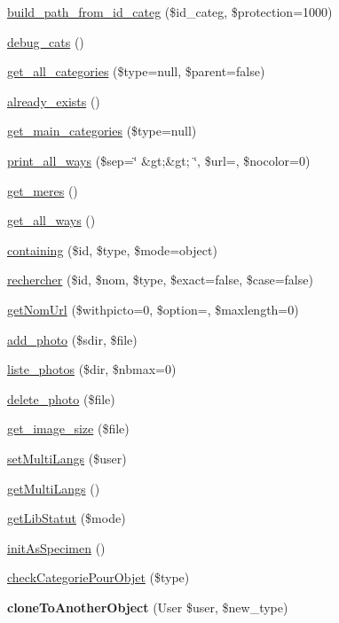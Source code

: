 \begin{DoxyCompactItemize}
\hyperlink{classCategorie_aa8539099fbf0facdd555963cdd13eb21}{build\+\_\+path\+\_\+from\+\_\+id\+\_\+categ} (\$id\+\_\+categ, \$protection=1000)
\item 
\hyperlink{classCategorie_a1ce1fc39978dbc51235945c2d6ae8d97}{debug\+\_\+cats} ()
\item 
\hyperlink{classCategorie_a7c7aa30b1bc78a03d658a4e9689c8b5a}{get\+\_\+all\+\_\+categories} (\$type=null, \$parent=false)
\item 
\hyperlink{classCategorie_a6f0eea2df4c86d7fcc0ffc89360eb765}{already\+\_\+exists} ()
\item 
\hyperlink{classCategorie_a8e991c6ac8e3d833082467de06616c19}{get\+\_\+main\+\_\+categories} (\$type=null)
\item 
\hyperlink{classCategorie_af1fdbc6874f2035558b5eb029c5978b7}{print\+\_\+all\+\_\+ways} (\$sep=\char`\"{} \&gt;\&gt; \char`\"{}, \$url=\textquotesingle{}\textquotesingle{}, \$nocolor=0)
\item 
\hyperlink{classCategorie_ab564dd2c08c0435dca64bb6488103475}{get\+\_\+meres} ()
\item 
\hyperlink{classCategorie_ae0a515bc7d441030158f4e98346bbf35}{get\+\_\+all\+\_\+ways} ()
\item 
\hyperlink{classCategorie_a426051910036f20087478d0571669bf8}{containing} (\$id, \$type, \$mode=\textquotesingle{}object\textquotesingle{})
\item 
\hyperlink{classCategorie_a63d73b5962b946574b04a7cc4f4d0629}{rechercher} (\$id, \$nom, \$type, \$exact=false, \$case=false)
\item 
\hyperlink{classCategorie_a44e201bbaa1ed20f8294b011415c3422}{get\+Nom\+Url} (\$withpicto=0, \$option=\textquotesingle{}\textquotesingle{}, \$maxlength=0)
\item 
\hyperlink{classCategorie_afec66863d28f5bcd67fcc4978210a8d9}{add\+\_\+photo} (\$sdir, \$file)
\item 
\hyperlink{classCategorie_adcff1d2273709a2851159fcf8706b50a}{liste\+\_\+photos} (\$dir, \$nbmax=0)
\item 
\hyperlink{classCategorie_a3a9059715e0e2506e61dc81f043067bd}{delete\+\_\+photo} (\$file)
\item 
\hyperlink{classCategorie_a10ef121fc94c1979487b764d5d3c0093}{get\+\_\+image\+\_\+size} (\$file)
\item 
\hyperlink{classCategorie_a0b5dc055b266e6135d381e14d12f9653}{set\+Multi\+Langs} (\$user)
\item 
\hyperlink{classCategorie_a65c43ada9300ca6df280ab5a0fc15a16}{get\+Multi\+Langs} ()
\item 
\hyperlink{classCategorie_a2d0a5aece806773cc0450b1815a585ff}{get\+Lib\+Statut} (\$mode)
\item 
\hyperlink{classCategorie_a75e2c9ba1d83d4ec062f228e409755b5}{init\+As\+Specimen} ()
\item 
\hyperlink{classCategorie_a30698fd26c01a2a205d5c987fe5d6c7f}{check\+Categorie\+Pour\+Objet} (\$type)
\item 
\mbox{\label{classCategorie_aa4a0030e4a8cd5ae89d155ebc3aa1627}} 
{\bfseries clone\+To\+Another\+Object} (User \$user, \$new\+\_\+type)
\end{DoxyCompactItemize}
